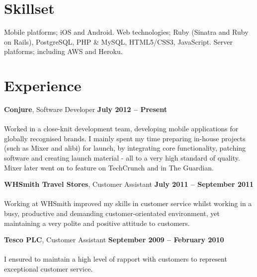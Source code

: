 \documentclass[margin,line,a4paper]{resume}
\begin{document}
\begin{resume}
    	\section{\mysidestyle Skillset}

	Mobile platforms; iOS and Android. Web technologies; Ruby (Sinatra and Ruby on Rails), PostgreSQL, PHP \& MySQL, HTML5/CSS3, JavaScript. Server platforms; including AWS and Heroku.

    	

	 \section{\mysidestyle Experience} 

	\textbf{Conjure}, Software Developer  \hfill \textbf{July 2012 -- Present}\\ 
	\vspace{-3mm}\\\vspace{0mm}%
	Worked in a close-knit development team, developing mobile applications for globally recognised brands.  I mainly spent my time preparing in-house projects (such as Mixer and alibi) for launch, by integrating core functionality, patching software and creating launch material - all to a very high standard of quality. Mixer later went on to feature on TechCrunch and in The Guardian.

	\textbf{WHSmith Travel Stores}, Customer Assistant \hfill \textbf{July 2011 -- September 2011}\\ 		
	\vspace{-3mm}\\\vspace{0mm}%
	Working at WHSmith improved my skills in customer service whilst working in a busy, productive and demanding customer-orientated environment, yet maintaining a very polite and positive attitude to customers.

    	\textbf{Tesco PLC}, Customer Assistant  \hfill \textbf{September 2009 -- February 2010}\\ 
	\vspace{-3mm}\\\vspace{0mm}%
	I ensured to maintain a high level of rapport with customers to represent exceptional customer service.


\end{resume}
\end{document}
